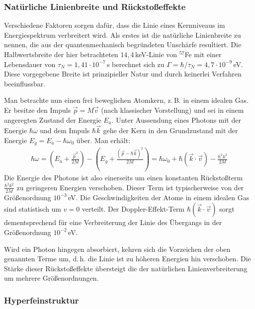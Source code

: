 	\subsubsection{Natürliche Linienbreite und Rückstoßeffekte}
	
	Verschiedene Faktoren sorgen dafür, dass die Linie eines Kernniveaus im Energiespektrum verbreitert wird. Als erstes ist die natürliche Linienbreite zu nennen, die aus der quantenmechanisch begründeten Unschärfe resultiert. Die Halbwertsbreite der hier betrachteten $14,4\,$keV-Linie von $^{57}$Fe mit einer Lebensdauer von $\tau_N=1,41\cdot 10^{-7}\,$s berechnet sich zu $\Gamma = \hbar/\tau_N=4,7\cdot10^{-9}\,$eV. Diese vorgegebene Breite ist prinzipieller Natur und durch keinerlei Verfahren beeinflussbar.
	
	Man betrachte nun einen frei beweglichen Atomkern, z.\,B. in einem idealen Gas. Er besitze den Impuls $\vec{p}=M\vec{v}$ (nach klassischer Vorstellung) und sei in einem angeregten Zustand der Energie $E_a$. Unter Aussendung eines Photons mit der Energie $\hbar \omega$ und dem Impuls $\hbar \vec{k}$ gehe der Kern in den Grundzustand mit der Energie $E_g = E_a -\hbar\omega_0$ über. Man erhält:
	\begin{align}
		\hbar \omega = \left( E_a + \frac{\vec{p}^2}{2M}\right)  - \left( E_g  + \frac{\left( \vec{p}-\hbar \vec{k}\right) ^2}{2M}\right) = \hbar\omega_0 + \hbar\left( \vec{k} \cdot \vec{v}\right) -\frac{\hbar^2k^2}{2M}
	\end{align}
	Die Energie des Photons ist also einerseits um einen konstanten Rückstoßterm $\frac{\hbar^2k^2}{2M}$ zu geringeren Energien verschoben. Dieser Term ist typischerweise von der Größenordnung $10^{-3}\,$eV. Die Geschwindigkeiten der Atome in einem idealen Gas sind statistisch um $v=0$ verteilt. Der Doppler-Effekt-Term $\hbar\left( \vec{k} \cdot \vec{v}\right)$ sorgt dementsprechend für eine Verbreiterung der Linie des Übergangs in der Größenordnung $10^{-2}\,$eV. 
	
	Wird ein Photon hingegen absorbiert, kehren sich die Vorzeichen der oben genannten Terme um, d.\,h. die Linie ist zu höheren Energien hin verschoben. Die Stärke dieser Rückstoßeffekte übersteigt die der natürlichen Linienverbreiterung um mehrere Größenordnungen.
	
	\subsubsection{Hyperfeinstruktur}
	
